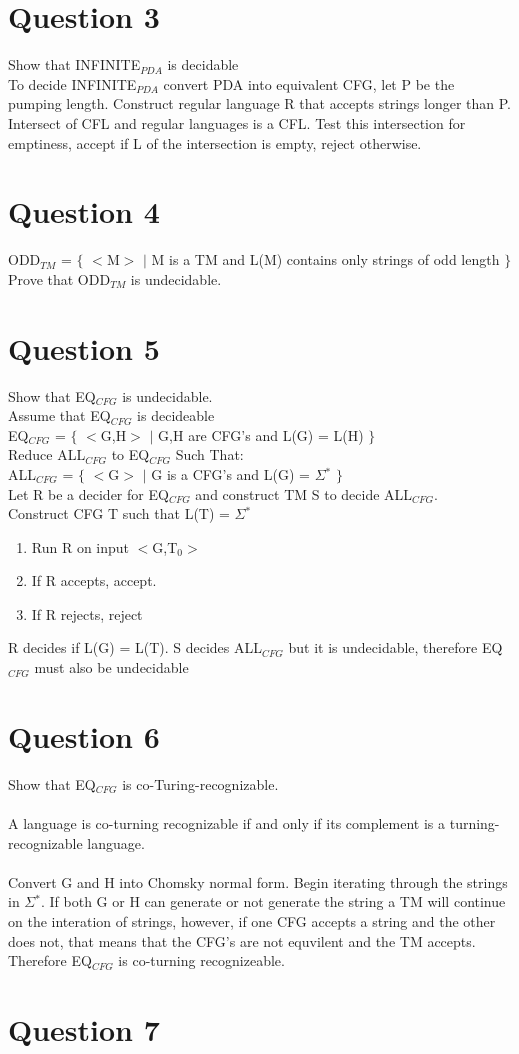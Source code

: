 \documentclass[10pt,a4paper]{article}
\begin{document}
\section*{Question 3}
Show that INFINITE$_{PDA}$ is decidable\\
To decide INFINITE$_{PDA}$ convert PDA into equivalent CFG, let P be the pumping length. Construct regular language R that accepts strings longer than P. Intersect of CFL and regular languages is a CFL. Test this intersection for emptiness, accept if L of the intersection is empty, reject otherwise.
\section*{Question 4}
ODD$_{TM}$ = $\lbrace$ $<$M$>$ $\mid$ M is a TM and L(M) contains only strings of odd length $\rbrace$
Prove that ODD$_{TM}$ is undecidable.
\section*{Question 5}
Show that EQ$_{CFG}$ is undecidable.\\
Assume that EQ$_{CFG}$ is decideable\\
EQ$_{CFG}$ = $\lbrace$ $<$G,H$>$ $\mid$ G,H are CFG's and L(G) = L(H) $\rbrace$
\\
Reduce ALL$_{CFG}$ to EQ$_{CFG}$ Such That:
\\
ALL$_{CFG}$ = $\lbrace$ $<$G$>$ $\mid$ G is a CFG's and L(G) = $\Sigma$$^{\ast}$ $\rbrace$
\\
Let R be a decider for EQ$_{CFG}$ and construct TM S to decide ALL$_{CFG}$.
\\
Construct CFG T such that L(T) = $\Sigma$$^{\ast}$
\begin{enumerate}
  \item Run R on input $<$G,T$_{0}$$>$
  \item If R accepts, accept.
  \item If R rejects, reject 
\end{enumerate}
R decides if L(G) = L(T). S decides ALL$_{CFG}$ but it is undecidable, therefore EQ$_{CFG}$ must also be undecidable 

\section*{Question 6}
Show that EQ$_{CFG}$ is co-Turing-recognizable.\\\\
A language is co-turning recognizable if and only if its complement is a turning-recognizable language.\\
\\
Convert G and H into Chomsky normal form. Begin iterating through the strings in $\Sigma$$^{\ast}$. If both G or H can generate or not generate the string a TM will continue on the interation of strings, however, if one CFG accepts a string and the other does not, that means that the CFG's are not equvilent and the TM accepts. Therefore EQ$_{CFG}$  is co-turning recognizeable.
\section*{Question 7}
\end{document}
